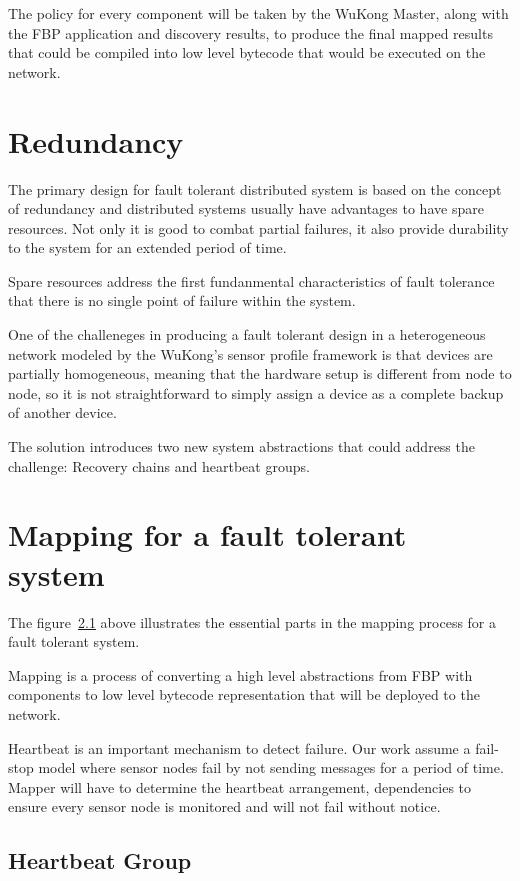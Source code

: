 The policy for every component will be taken by the WuKong Master, along with
the FBP application and discovery results, to produce the final mapped results
that could be compiled into low level bytecode that would be executed on the
network.

\section{Redundancy}

The primary design for fault tolerant distributed system is based on the
concept of redundancy and distributed systems usually have advantages to have
spare resources. Not only it is good to combat partial failures, it also
provide durability to the system for an extended period of time.

Spare resources address the first fundanmental characteristics of fault
tolerance that there is no single point of failure within the system.

One of the challeneges in producing a fault tolerant design in a heterogeneous
network modeled by the WuKong's sensor profile framework is that devices are
partially homogeneous, meaning that the hardware setup is different from node
to node, so it is not straightforward to simply assign a device as a complete
backup of another device.

The solution introduces two new system abstractions that could address the
challenge: Recovery chains and heartbeat groups.

\section{Mapping for a fault tolerant system}

The figure~\ref{} above illustrates the essential parts in the mapping process
for a fault tolerant system.

Mapping is a process of converting a high level abstractions from FBP with
components to low level bytecode representation that will be deployed to the
network.

Heartbeat is an important mechanism to detect failure. Our work assume
a fail-stop model where sensor nodes fail by not sending messages for a period
of time. Mapper will have to determine the heartbeat arrangement, dependencies
to ensure every sensor node is monitored and will not fail without notice.

\subsection{Heartbeat Group}

